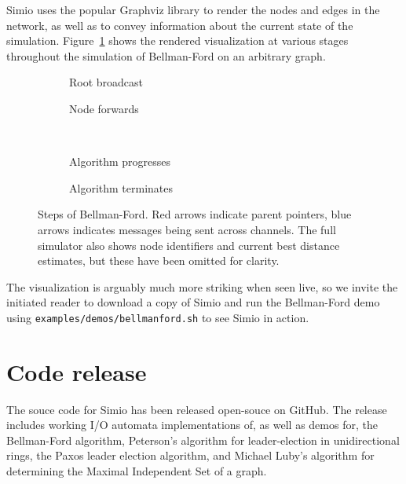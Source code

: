 \documentclass{scrartcl}
\begin{document}
Simio uses the popular Graphviz library\cite{gv} to render the nodes and edges
in the network, as well as to convey information about the current state of the
simulation. Figure~\ref{fig:viz} shows the rendered visualization at various
stages throughout the simulation of Bellman-Ford on an arbitrary graph.

\begin{figure}[h]
	\centering
	\begin{subfigure}[b]{0.49\textwidth}
		
		\caption{Root broadcast}
	\end{subfigure}
	\begin{subfigure}[b]{0.49\textwidth}
		
		\caption{Node forwards}
	\end{subfigure}
	\\
	\begin{subfigure}[b]{0.49\textwidth}
		
		\caption{Algorithm progresses}
	\end{subfigure}
	\begin{subfigure}[b]{0.49\textwidth}
		
		\caption{Algorithm terminates}
	\end{subfigure}
	\caption{Steps of Bellman-Ford. Red arrows indicate parent pointers,
		blue arrows indicates messages being sent across channels. The
		full simulator also shows node identifiers and current best
		distance estimates, but these have been omitted for clarity.}\label{fig:viz}
\end{figure}

The visualization is arguably much more striking when seen live, so we invite
the initiated reader to download a copy of Simio and run the Bellman-Ford demo
using \texttt{examples/demos/bellmanford.sh} to see Simio in action.

\section{Code release}

The souce code for Simio has been released open-souce on GitHub\cite{simio}.
The release includes working I/O automata implementations of, as well as demos
for, the Bellman-Ford algorithm, Peterson's algorithm for leader-election in
unidirectional rings\cite{peterson}, the Paxos leader election
algorithm\cite{paxos}, and Michael Luby's algorithm for determining the Maximal
Independent Set of a graph\cite{lubymis}.
\end{document}
